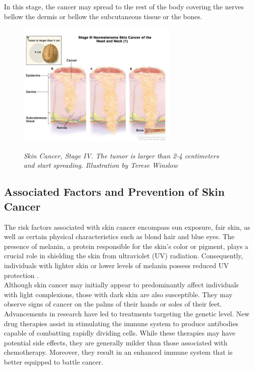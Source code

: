 In this stage, the cancer may spread to the rest of the body covering the nerves bellow the dermis or bellow the subcutaneous tissue or the bones.

\begin{figure}[H]
\centering
\includegraphics[width=0.7\textwidth]{imatges/problem_domain/stage3-skin-cancer.jpg}
\caption[Skin Cancer, Stage IV]{\textit{Skin Cancer, Stage IV. The tumor is larger than 2-4 centimeters and start spreading. Illustration by Terese Winslow}}
{\label{fig:stage3-skin-canceer}}
\end{figure}

\newpage

\subsection{Associated Factors and Prevention of Skin Cancer}

The risk factors associated with skin cancer encompass sun exposure, fair skin, as well as certain physical characteristics such as blond hair and blue eyes. The presence of melanin, a protein responsible for the skin's color or pigment, plays a crucial role in shielding the skin from ultraviolet (UV) radiation. Consequently, individuals with lighter skin or lower levels of melanin possess reduced UV protection \cite{OrigenAndTreatment}. \\

Although skin cancer may initially appear to predominantly affect individuals with light complexions, those with dark skin are also susceptible. They may observe signs of cancer on the palms of their hands or soles of their feet. \\

Advancements in research have led to treatments targeting the genetic level. New drug therapies assist in stimulating the immune system to produce antibodies capable of combatting rapidly dividing cells. While these therapies may have potential side effects, they are generally milder than those associated with chemotherapy. Moreover, they result in an enhanced immune system that is better equipped to battle cancer. \\

